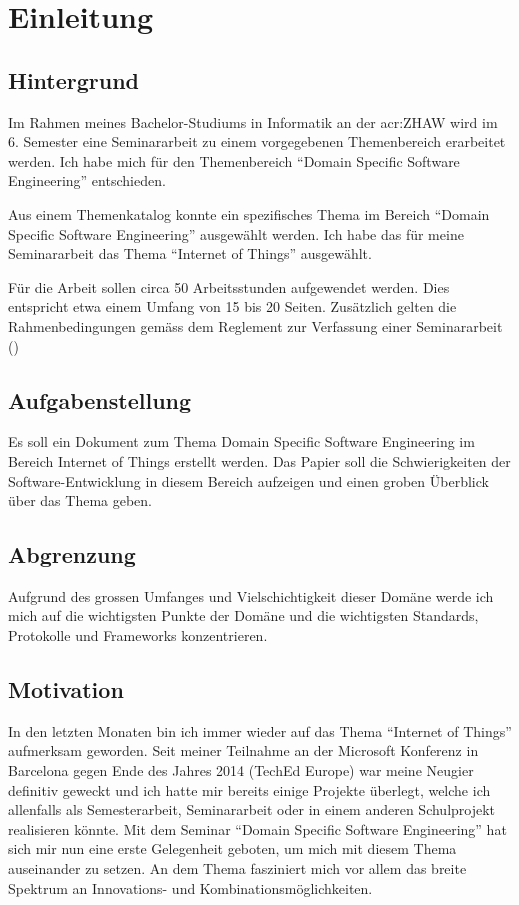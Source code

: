 
\chapter{Einleitung}

\section{Hintergrund}
Im Rahmen meines Bachelor-Studiums in Informatik an der \gls{acr:ZHAW} wird im 6. Semester eine Seminararbeit zu einem vorgegebenen Themenbereich erarbeitet werden. Ich habe mich für den Themenbereich "`Domain Specific Software Engineering"' entschieden.

Aus einem Themenkatalog konnte ein spezifisches Thema im Bereich "`Domain Specific Software Engineering"' ausgewählt werden. Ich habe das für meine Seminararbeit das Thema "`Internet of Things"' ausgewählt.

Für die Arbeit sollen circa 50 Arbeitsstunden aufgewendet werden. Dies entspricht etwa einem Umfang von 15 bis 20 Seiten. Zusätzlich gelten die Rahmenbedingungen gemäss dem Reglement zur Verfassung einer Seminararbeit (\cite{ZHAW:2012:Seminararbeit:Reglemente})

\section{Aufgabenstellung}
Es soll ein Dokument zum Thema Domain Specific Software Engineering im Bereich Internet of Things erstellt werden. Das Papier soll die Schwierigkeiten der Software-Entwicklung in diesem Bereich aufzeigen und einen groben Überblick über das Thema geben.

\section{Abgrenzung}
Aufgrund des grossen Umfanges und Vielschichtigkeit dieser Domäne werde ich mich auf die wichtigsten Punkte der Domäne und die wichtigsten Standards, Protokolle und Frameworks konzentrieren.

\section{Motivation}
In den letzten Monaten bin ich immer wieder auf das Thema "`Internet of Things"' aufmerksam geworden. Seit meiner Teilnahme an der Microsoft Konferenz in Barcelona gegen Ende des Jahres 2014 (TechEd Europe) war meine Neugier definitiv geweckt und ich hatte mir bereits einige Projekte überlegt, welche ich allenfalls als Semesterarbeit, Seminararbeit oder in einem anderen Schulprojekt realisieren könnte. Mit dem Seminar "`Domain Specific Software Engineering"' hat sich mir nun eine erste Gelegenheit geboten, um mich mit diesem Thema auseinander zu setzen. An dem Thema fasziniert mich vor allem das breite Spektrum an Innovations- und Kombinationsmöglichkeiten.


